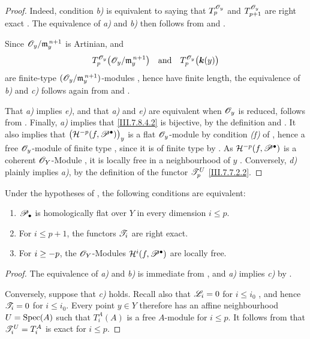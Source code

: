 \begin{proof}
Indeed, condition \emph{b)} is equivalent to saying that
$T_p^{\mathscr{O}_y}$ and $T_{p+1}^{\mathscr{O}_y}$ are
right exact .  The equivalence of \emph{a)} and \emph{b)}
then follows from  and
.

Since $\mathscr{O}_y/\mathfrak m_y^{\,n+1}$ is Artinian, and
\[
  T_p^{\mathscr{O}_y}
    \bigl(\mathscr{O}_y/\mathfrak m_y^{\,n+1}\bigr)
  \quad\hbox{and}\quad
  T_p^{\mathscr{O}_y}\bigl(\boldsymbol{k}(y)\bigr)
\]
are finite-type
$(\mathscr{O}_y/\mathfrak m_y^{\,n+1})$-modules
, hence have finite length, the equivalence
of \emph{b)} and \emph{c)} follows again from  and
.

That \emph{a)} implies \emph{e)}, and that \emph{a)} and \emph{e)} are equivalent when
$\mathscr{O}_y$ is reduced, follows from .
Finally, \emph{a)} implies that \eqref{III.7.8.4.2} is bijective,
by the definition  and
.  It also implies that $\bigl(\mathcal{H}^{-p}(f,\mathscr{P}^\bullet)\bigr)_y$
is a flat $\mathscr{O}_y$-module by condition \emph{(f)} of
, hence a
free $\mathscr{O}_y$-module of finite type
, since it is of finite type by
.  As
$\mathcal{H}^{-p}(f,\mathscr{P}^\bullet)$ is a coherent
$\mathscr{O}_Y$-Module , it is locally free in
a neighbourhood of $y$ .
Conversely, \emph{d)} plainly implies \emph{a)}, by the definition of the
functor $\mathscr{T}_p^U$ \eqref{III.7.7.2.2}.
\end{proof}

\begin{proposition}[7.8.5]
\label{III.7.8.5}
Under the hypotheses of , the following
conditions are equivalent:
\begin{enumerate}
  \item[\textup{a)}] $\mathscr{P}_\bullet$ is homologically flat over $Y$
  in every dimension $i\leq p$.
  \item[\textup{b)}] For $i\leq p+1$, the functors $\mathscr{T}_i$ are
  right exact.
  \item[\textup{c)}] For $i\geq- p$, the $\mathscr{O}_Y$-Modules
  $\mathcal{H}^{i}(f,\mathscr{P}^\bullet)$ are locally free.
\end{enumerate}
\end{proposition}

\begin{proof}
The equivalence of \emph{a)} and \emph{b)} is immediate from
, and \emph{a)} implies \emph{c)} by
.

Conversely, suppose that \emph{c)} holds.  Recall also that
$\mathscr{L}_i=0$ for $i\leq i_0$ , and hence
$\mathscr{T}_i=0$ for $i\leq i_0$.  Every point $y\in Y$
therefore has an affine neighbourhood
$U=\operatorname{Spec}(A)$ such that $T_i^A(A)$ is a free $A$-module for
$i\leq p$.  It follows from  that
$\mathscr{T}_i^U=T_i^A$ is exact for $i\leq p$.
\end{proof}

